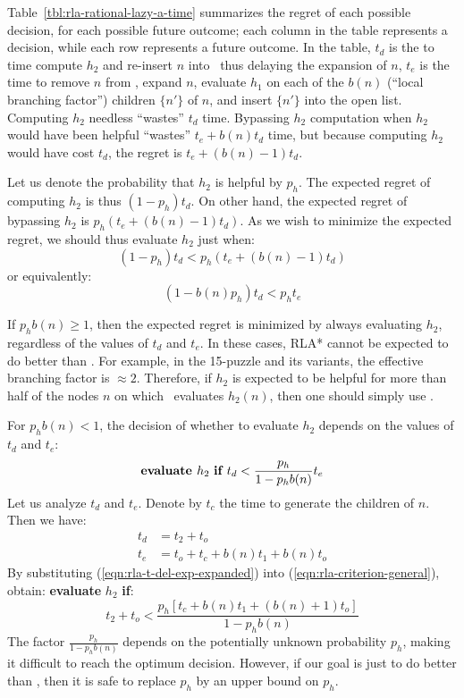 Table~\ref{tbl:rla-rational-lazy-a-time}
summarizes the regret of each possible decision, for each possible future
outcome; each column in the table represents a decision, while each row
represents a future outcome.
In the table, $t_d$ is the to time compute $h_2$ and re-insert $n$ into
\OPEN~thus delaying the expansion of $n$, $t_e$ is the time to remove $n$ from \OPEN,
expand $n$, evaluate $h_1$ on each of the $b(n)$ (``local branching factor'')
children $\{n'\}$ of $n$, and insert $\{n'\}$ into the open list.
Computing $h_2$ needless ``wastes'' $t_d$ time.
Bypassing $h_2$ computation when $h_2$ would have been helpful ``wastes''
$t_e+b(n)t_d$ time, but because computing $h_2$ would have cost $t_d$, the
regret is $t_e+(b(n)-1)t_d$.

Let us denote the probability that $h_2$ is helpful by
$p_h$. The expected regret of computing $h_2$ is thus $(1-p_h) t_d$.
On other hand, the expected regret of bypassing $h_2$ is $p_h(
t_e+(b(n)-1)t_d)$. As we wish to minimize the expected regret, we should thus evaluate $h_2$ just when:
\begin{equation}
(1-p_h) t_d < p_h (t_e+(b(n)-1)t_d)
\end{equation}
or equivalently:
\begin{equation}
(1-b(n) p_h) t_d < p_h t_e
\end{equation}

If $p_h b(n) \ge 1$, then the expected regret is minimized by always
evaluating $h_2$, regardless of the values of $t_d$ and $t_e$.  In
these cases, RLA* cannot be expected to do better than \lazyastar.
For example, in the 15-puzzle and its variants, the effective
branching factor is $\approx 2$. Therefore, if $h_2$ is expected to be
helpful for more than half of the nodes $n$ on which
\lazyastar~evaluates $h_2(n)$, then one should simply use \lazyastar.

For $p_h b(n) < 1$,  the decision of whether to evaluate $h_2$
depends on the values of $t_d$ and $t_e$:
\begin{equation}
\mbox{\bf evaluate }h_2\mbox{ \bf if }t_d<\frac {p_h} {1-p_hb(n)} t_e
\label{eqn:rla-criterion-general}
\end{equation}
Let us analyze $t_d$ and $t_e$. Denote by
$t_c$ the time to generate the children of $n$. Then we have:
\begin{align}
t_d&=t_2+t_o\nonumber\\
t_e&=t_o + t_c+b (n) t_1 + b(n) t_o
\label{eqn:rla-t-del-exp-expanded}
\end{align}
By substituting
(\ref{eqn:rla-t-del-exp-expanded}) into (\ref{eqn:rla-criterion-general}), obtain: {\bf evaluate} $h_2$ {\bf if}:
\begin{equation}
{t_2+t_o}<\frac {p_h \left[{t_c} + b (n)t_1+(b(n)+1){t_o}\right]} {1-p_hb(n)}
\label{eqn:rla-criterion-expanded}
\end{equation}
The factor $\frac {p_h} {1-p_hb(n)}$ depends on the potentially unknown
probability $p_h$, making it difficult to reach the optimum decision.
However, if our goal is just to do better than \lazyastar, then it is safe to replace $p_h$ by an upper bound on $p_h$.

